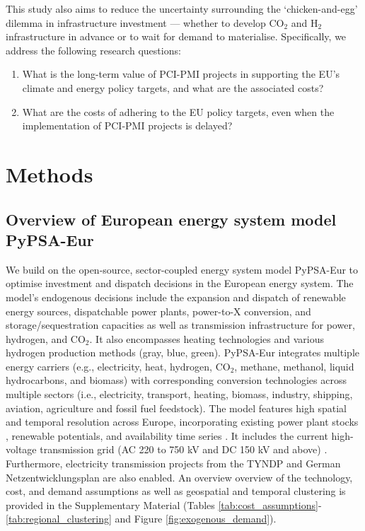 \documentclass[pdflatex,sn-nature]{sn-jnl}
\theoremstyle{thmstyleone}%
\theoremstyle{thmstyletwo}%
\theoremstyle{thmstylethree}%
\begin{document}
This study also aims to reduce the uncertainty surrounding the `chicken-and-egg' dilemma in infrastructure investment --- whether to develop CO$_2$ and H$_2$ infrastructure in advance or to wait for demand to materialise. Specifically, we address the following research questions: 
\begin{enumerate} 
  \item What is the long-term value of PCI-PMI projects in supporting the EU’s climate and energy policy targets, and what are the associated costs?
  \item What are the costs of adhering to the EU policy targets, even when the implementation of PCI-PMI projects is delayed?
\end{enumerate}

\section{Methods}\label{sec:methods}
\subsection{Overview of European energy system model PyPSA-Eur}
We build on the open-source, sector-coupled energy system model PyPSA-Eur \cite{neumannPotentialRoleHydrogen2023,frysztackiComparisonClusteringMethods2022,glaumOffshorePowerHydrogen2024,horschPyPSAEurOpenOptimisation2018} to optimise investment and dispatch decisions in the European energy system. The model's endogenous decisions include the expansion and dispatch of renewable energy sources, dispatchable power plants, power-to-X conversion, and storage/sequestration capacities as well as transmission infrastructure for power, hydrogen, and CO$_2$. It also encompasses heating technologies and various hydrogen production methods (gray, blue, green).
PyPSA-Eur integrates multiple energy carriers (e.g., electricity, heat, hydrogen, CO$_2$, methane, methanol, liquid hydrocarbons, and biomass) with corresponding conversion technologies across multiple sectors (i.e., electricity, transport, heating, biomass, industry, shipping, aviation, agriculture and fossil fuel feedstock). The model features high spatial and temporal resolution across Europe, incorporating existing power plant stocks \cite{gotzensPerformingEnergyModelling2019}, renewable potentials, and availability time series \cite{hofmannAtliteLightweightPython2021}. It includes the current high-voltage transmission grid (AC 220 to 750 kV and DC 150 kV and above) \cite{xiongModellingHighvoltageGrid2025}. Furthermore, electricity transmission projects from the TYNDP \cite{entso-eTenYearNetworkDevelopment2020} and German Netzentwicklungsplan \cite{bnetzaBestaetigungNetzentwicklungsplanStrom2024} are also enabled. An overview overview of the technology, cost, and demand assumptions as well as geospatial and temporal clustering is provided in the Supplementary Material (Tables \ref{tab:cost_assumptions}-\ref{tab:regional_clustering} and Figure \ref{fig:exogenous_demand}).
\end{document}
